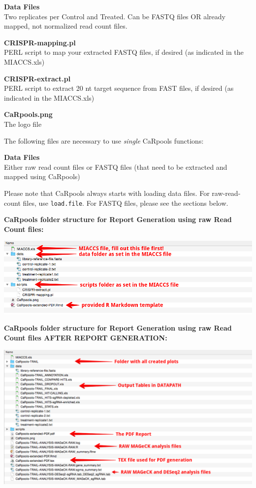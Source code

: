 \documentclass[]{article}
\begin{document}
\textbf{Data Files}\\
Two replicates per Control and Treated. Can be FASTQ files OR already
mapped, not normalized read count files.

\textbf{CRISPR-mapping.pl}\\
PERL script to map your extracted FASTQ files, if desired (as indicated
in the MIACCS.xls)

\textbf{CRISPR-extract.pl}\\
PERL script to extract 20 nt target sequence from FAST files, if desired
(as indicated in the MIACCS.xls)

\textbf{CaRpools.png}\\
The logo file

The following files are necessary to use \emph{single} CaRpools
functions:

\textbf{Data Files}\\
Either raw read count files or FASTQ files (that need to be extracted
and mapped using CaRpools)

Please note that CaRpools always starts with loading data files. For
raw-read-count files, use \texttt{load.file}. For FASTQ files, please
see the sections below.

\newpage

\textbf{CaRpools folder structure for Report Generation using raw Read
Count files:}

\includegraphics{./pictures/folder-structure-before.png}

\newpage

\textbf{CaRpools folder structure for Report Generation using raw Read
Count files AFTER REPORT GENERATION:}

\includegraphics{./pictures/folder-structure-FINAL.png}
\end{document}
